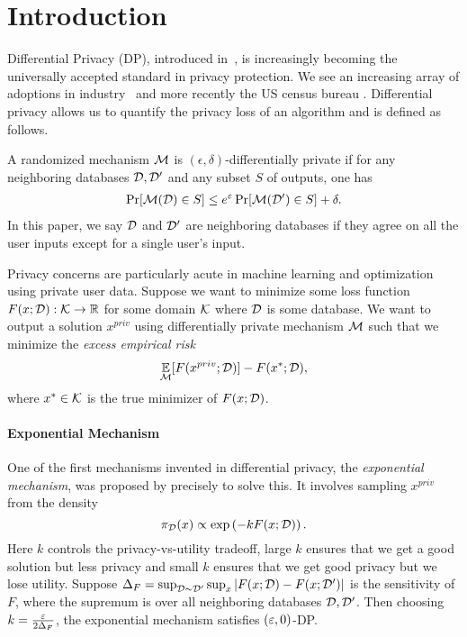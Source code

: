 \section{Introduction}
Differential Privacy (DP), introduced in~\cite{DMNS06,DKMMN06}, is increasingly becoming the universally accepted standard in privacy protection. We see an increasing array of adoptions in industry~\cite{Apple17,EPK14,BEM+17,DKY17} and more recently the US census bureau \cite{Abo16,KCK+18}. 
Differential privacy allows us to quantify the privacy loss of an algorithm and is defined as follows.

\begin{definition}
A randomized mechanism $\operatorname*{\mathcal{M}}$ is $(\epsilon,\delta)$-differentially private if for any neighboring databases $\mathcal D,\mathcal D'$ and any subset $S$ of outputs, one has
\begin{align*}
    \Pr[\operatorname*{\mathcal{M}}(\mathcal D)\in S]\leq e^\varepsilon\Pr[\operatorname*{\mathcal{M}}(\mathcal D')\in S] +\delta.
\end{align*} In this paper, we say $\mathcal D$ and $\mathcal D'$ are neighboring databases if they agree on all the user inputs except for a single user's input.
\end{definition}

Privacy concerns are particularly acute in machine learning and optimization using private user data. Suppose we want to minimize some loss function $F(x;\mathcal D):\mathcal K\to \mathbb{R}$ for some domain $\mathcal K$ where $\mathcal D$ is some database.
We want to output a solution $x^{priv}$ using differentially private mechanism $\mathcal M$ such that we minimize the \emph{excess empirical risk}
\begin{equation}
\label{eqn:empirical_risk}
\operatorname*{\mathbb{E}}_{\mathcal M}[F(x^{priv};\mathcal D)]-F(x^*;\mathcal D),    
\end{equation}
 where $x^*\in \mathcal K$ is the true minimizer of $F(x;\mathcal D)$. 
 
 \paragraph{Exponential Mechanism} One of the first mechanisms invented in differential privacy, the \emph{exponential mechanism}, was proposed by \cite{MT07} precisely to solve this. It involves sampling $x^{priv}$ from the density 
\begin{equation}
    \label{eqn:exponential_mechanism}
    \pi_\mathcal D(x)\propto \exp\left(-kF(x;\mathcal D)\right).
\end{equation}
 Here $k$ controls the privacy-vs-utility tradeoff, large $k$ ensures that we get a good solution but less privacy and small $k$ ensures that we get good privacy but we lose utility. Suppose $\Delta_F = \sup_{\mathcal D\sim\mathcal D'} \sup_x |F(x;\mathcal D)-F(x;\mathcal D')|$ is the sensitivity of $F$, where the supremum is over all neighboring databases $\mathcal D,\mathcal D'$. Then choosing $k=\frac{\varepsilon}{2\Delta_F}$, the exponential mechanism satisfies $(\varepsilon,0)$-DP. 
 
